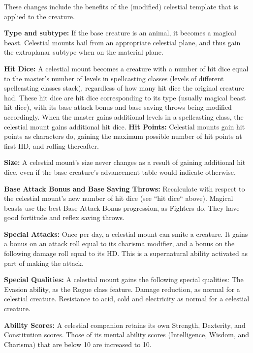 These changes include the benefits of the (modified) celestial template that is applied to the creature.
\begin{list}{}{\leftmargin=1em}
 \item \textbf{Type and subtype:} If the base creature is an animal, it becomes a magical beast.
 Celestial mounts hail from an appropriate celestial plane, and thus gain the extraplanar subtype when on the material plane.
 \item \textbf{Hit Dice:} A celestial mount becomes a creature with a number of hit dice equal to the master's number of levels in spellcasting classes 
 (levels of different spellcasting classes stack), 
 regardless of how many hit dice the original creature had. 
 These hit dice are hit dice corresponding to its type (usually magical beast hit dice), with its base attack bonus and base saving throws being modified accordingly.
 When the master gains additional levels in a spellcasting class, the celestial mount gains additional hit dice. 
 \subitem \textbf{Hit Points:} Celestial mounts gain hit points as characters do, gaining the maximum possible number of hit points at first HD, 
 and rolling thereafter.
 \item \textbf{Size:} A celestial mount's size never changes as a result of gaining additional hit dice, even if the base creature's advancement table would indicate otherwise.
 \item \textbf{Base Attack Bonus and Base Saving Throws:} Recalculate with respect to the celestial mount's new number of hit dice (see ``hit dice`` above). 
 Magical beasts use the best Base Attack Bonus progression, as Fighters do. They have good fortitude and reflex saving throws.
 \item \textbf{Special Attacks:} Once per day, a celestial mount can smite a creature.
 It gains a bonus on an attack roll equal to its charisma modifier, and a bonus on the following damage roll equal to its HD.
 This is a supernatural ability activated as part of making the attack.
 \item \textbf{Special Qualities:} A celestial mount gains the following special qualities:
 \subitem The Evasion ability, as the Rogue class feature.
 \subitem Damage reduction, as normal for a celestial creature.
 \subitem Resistance to acid, cold and electricity as normal for a celestial creature.
 \item \textbf{Ability Scores:} A celestial companion retains its own Strength, Dexterity, and Constitution scores. 
 Those of its mental ability scores (Intelligence, Wisdom, and Charisma) that are below 10 are increased to 10.

\end{list}
